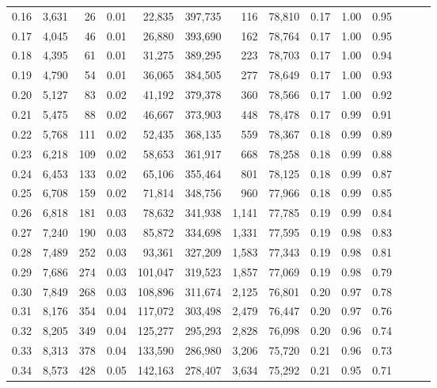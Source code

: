 \begin{tabular}{rrrrrrrrrrrrrr}
0.16 &  3,631 &     26 &  0.01 &   22,835 &  397,735 &     116 &  78,810 &  0.17 &  1.00 &      0.95 \\
0.17 &  4,045 &     46 &  0.01 &   26,880 &  393,690 &     162 &  78,764 &  0.17 &  1.00 &      0.95 \\
0.18 &  4,395 &     61 &  0.01 &   31,275 &  389,295 &     223 &  78,703 &  0.17 &  1.00 &      0.94 \\
0.19 &  4,790 &     54 &  0.01 &   36,065 &  384,505 &     277 &  78,649 &  0.17 &  1.00 &      0.93 \\
0.20 &  5,127 &     83 &  0.02 &   41,192 &  379,378 &     360 &  78,566 &  0.17 &  1.00 &      0.92 \\
0.21 &  5,475 &     88 &  0.02 &   46,667 &  373,903 &     448 &  78,478 &  0.17 &  0.99 &      0.91 \\
0.22 &  5,768 &    111 &  0.02 &   52,435 &  368,135 &     559 &  78,367 &  0.18 &  0.99 &      0.89 \\
0.23 &  6,218 &    109 &  0.02 &   58,653 &  361,917 &     668 &  78,258 &  0.18 &  0.99 &      0.88 \\
0.24 &  6,453 &    133 &  0.02 &   65,106 &  355,464 &     801 &  78,125 &  0.18 &  0.99 &      0.87 \\
0.25 &  6,708 &    159 &  0.02 &   71,814 &  348,756 &     960 &  77,966 &  0.18 &  0.99 &      0.85 \\
0.26 &  6,818 &    181 &  0.03 &   78,632 &  341,938 &   1,141 &  77,785 &  0.19 &  0.99 &      0.84 \\
0.27 &  7,240 &    190 &  0.03 &   85,872 &  334,698 &   1,331 &  77,595 &  0.19 &  0.98 &      0.83 \\
0.28 &  7,489 &    252 &  0.03 &   93,361 &  327,209 &   1,583 &  77,343 &  0.19 &  0.98 &      0.81 \\
0.29 &  7,686 &    274 &  0.03 &  101,047 &  319,523 &   1,857 &  77,069 &  0.19 &  0.98 &      0.79 \\
0.30 &  7,849 &    268 &  0.03 &  108,896 &  311,674 &   2,125 &  76,801 &  0.20 &  0.97 &      0.78 \\
0.31 &  8,176 &    354 &  0.04 &  117,072 &  303,498 &   2,479 &  76,447 &  0.20 &  0.97 &      0.76 \\
0.32 &  8,205 &    349 &  0.04 &  125,277 &  295,293 &   2,828 &  76,098 &  0.20 &  0.96 &      0.74 \\
0.33 &  8,313 &    378 &  0.04 &  133,590 &  286,980 &   3,206 &  75,720 &  0.21 &  0.96 &      0.73 \\
0.34 &  8,573 &    428 &  0.05 &  142,163 &  278,407 &   3,634 &  75,292 &  0.21 &  0.95 &      0.71 \\

\end{tabular}
